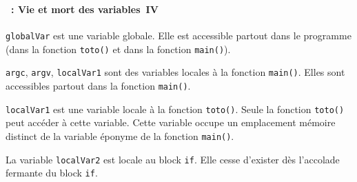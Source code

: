 \begin{frame}[containsverbatim]
  \frametitle{\secname}
  \framesubtitle{\subsecname~: Vie et mort des variables~IV}
  
  \verb|globalVar| est une variable globale. Elle est accessible partout dans le programme (dans la fonction \verb|toto()| et dans la fonction \verb|main()|).
  \vspace{0.5cm}
  \par
  \verb|argc|, \verb|argv|, \verb|localVar1| sont des variables locales à la fonction \verb|main()|. Elles sont accessibles partout dans la fonction \verb|main()|.
  \vspace{0.5cm}
  \par
  \verb|localVar1| est une variable locale à la fonction \verb|toto()|. Seule la fonction \verb|toto()| peut accéder à cette variable. 
  Cette variable occupe un emplacement mémoire distinct de la variable éponyme de la fonction \verb|main()|.
  \vspace{0.5cm}
  \par
  La variable \verb|localVar2| est locale au block \verb|if|. Elle cesse d'exister dès l'accolade fermante du block \verb|if|.
\end{frame}

